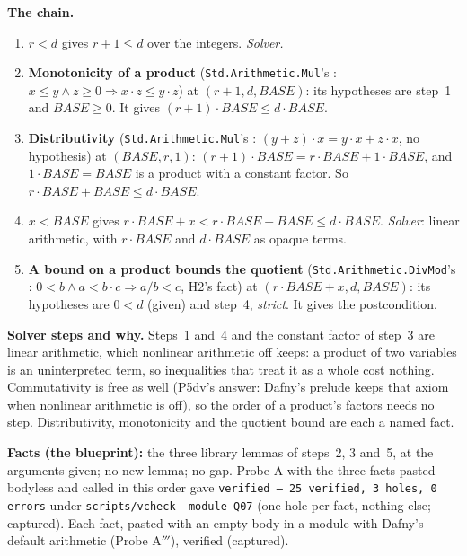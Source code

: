 \documentclass[11pt]{article}
\begin{document}
\textbf{The chain.}
\begin{enumerate}
\item $r < d$ gives $r + 1 \leq d$ over the integers. \emph{Solver.}
\item \textbf{Monotonicity of a product} (\texttt{Std.Arithmetic.Mul}'s
  : $x \leq y \wedge z \geq 0 \Rightarrow
  x \cdot z \leq y \cdot z$) at $(r + 1, d, \mathit{BASE})$: its hypotheses
  are step~1 and $\mathit{BASE} \geq 0$. It gives
  $(r + 1) \cdot \mathit{BASE} \leq d \cdot \mathit{BASE}$.
\item \textbf{Distributivity} (\texttt{Std.Arithmetic.Mul}'s
  :
  $(y + z) \cdot x = y \cdot x + z \cdot x$, no hypothesis) at
  $(\mathit{BASE}, r, 1)$: $(r + 1) \cdot \mathit{BASE} = r \cdot \mathit{BASE}
  + 1 \cdot \mathit{BASE}$, and $1 \cdot \mathit{BASE} = \mathit{BASE}$ is a
  product with a constant factor. So
  $r \cdot \mathit{BASE} + \mathit{BASE} \leq d \cdot \mathit{BASE}$.
\item $x < \mathit{BASE}$ gives $r \cdot \mathit{BASE} + x <
  r \cdot \mathit{BASE} + \mathit{BASE} \leq d \cdot \mathit{BASE}$.
  \emph{Solver}: linear arithmetic, with $r \cdot \mathit{BASE}$ and
  $d \cdot \mathit{BASE}$ as opaque terms.
\item \textbf{A bound on a product bounds the quotient}
  (\texttt{Std.Arithmetic.DivMod}'s :
  $0 < b \wedge a < b \cdot c \Rightarrow a / b < c$, H2's fact) at
  $(r \cdot \mathit{BASE} + x, d, \mathit{BASE})$: its hypotheses are $0 < d$
  (given) and step~4, \emph{strict}. It gives the postcondition.
\end{enumerate}
\textbf{Solver steps and why.} Steps~1 and~4 and the constant factor of
step~3 are linear arithmetic, which nonlinear arithmetic off keeps: a product
of two variables is an uninterpreted term, so inequalities that treat it as a
whole cost nothing. Commutativity is free as well (P5dv's answer: Dafny's
prelude keeps that axiom when nonlinear arithmetic is off), so the order of a
product's factors needs no step. Distributivity, monotonicity and the
quotient bound are each a named fact.

\textbf{Facts (the blueprint):} the three library lemmas of steps~2, 3 and~5,
at the arguments given; no new lemma; no gap. Probe A with the three facts
pasted bodyless and called in this order gave \texttt{verified --- 25 verified,
3 holes, 0 errors} under \texttt{scripts/vcheck --module Q07} (one hole per
fact, nothing else; captured). Each fact, pasted with an empty body in a module
with Dafny's default arithmetic (Probe A$'''$), verified (captured).
\end{document}
